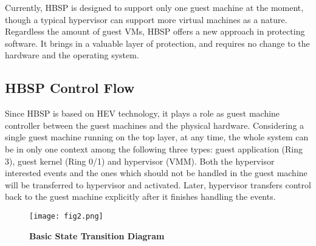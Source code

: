 \documentclass[conference]{IEEEtran}
\begin{document}

Currently, HBSP is designed to support only one guest machine at the
moment, though a typical hypervisor can support more virtual
machines as a nature. Regardless the amount of guest VMs, HBSP
offers a new approach in protecting software. It brings in a
valuable layer of protection, and requires no change to the hardware
and the operating system.

\subsection{HBSP Control Flow}
Since HBSP is based on HEV technology, it plays a role as guest
machine controller between the guest machines and the physical
hardware. Considering a single guest machine running on the top
layer, at any time, the whole system can be in only one context
among the following three types: guest application (Ring 3), guest
kernel (Ring 0/1) and hypervisor (VMM). Both the hypervisor
interested events and the ones which should not be handled in the
guest machine will be transferred to hypervisor and activated.
Later, hypervisor transfers control back to the guest machine
explicitly after it finishes handling the events.

\begin{figure}[!htb]
\begin{center}
\texttt{[image: fig2.png]}
\end{center}
\caption{{\bf Basic State Transition Diagram}} \label{Figure 2.}
\end{figure}
\end{document}
